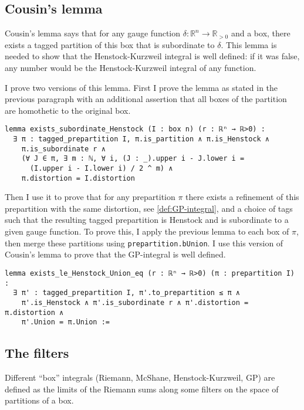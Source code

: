 \documentclass[a4paper,UKenglish,cleveref, autoref, thm-restate]{lipics-v2021}
\newcommand{\bbR}{\mathbb{R}}
\begin{document}
\subsection{Cousin's lemma}\label{sec:cousins-lemma}

Cousin's lemma says that for any gauge function
\(\delta\colon\bbR^{n}\to\bbR_{>0}\) and a box, there exists a tagged
partition of this box that is subordinate to \(\delta\). This lemma is
needed to show that the Henstock-Kurzweil integral is well defined: if
it was false, any number would be the Henstock-Kurzweil integral of
any function.

I prove two versions of this lemma. First I prove the lemma as stated
in the previous paragraph with an additional assertion that all boxes
of the partition are homothetic to the original box.

\begin{lstlisting}[caption={Cousin's lemma, version 1}]
lemma exists_subordinate_Henstock (I : box n) (r : ℝⁿ → ℝ>0) :
  ∃ π : tagged_prepartition I, π.is_partition ∧ π.is_Henstock ∧
    π.is_subordinate r ∧
    (∀ J ∈ π, ∃ m : ℕ, ∀ i, (J : _).upper i - J.lower i =
      (I.upper i - I.lower i) / 2 ^ m) ∧
    π.distortion = I.distortion
\end{lstlisting}

Then I use it to prove that for any prepartition \(\pi\) there exists
a refinement of this prepartition with the same distortion, see
\autoref{def:GP-integral}, and a choice of tags such that the
resulting tagged prepartition is Henstock and is subordinate to a
given gauge function. To prove this, I apply the previous lemma to
each box of \(\pi\), then merge these partitions using
\lstinline=prepartition.bUnion=. I use this version of Cousin's lemma
to prove that the GP-integral is well defined.

\begin{lstlisting}[caption={Cousin's lemma, version 2}]
lemma exists_le_Henstock_Union_eq (r : ℝⁿ → ℝ>0) (π : prepartition I) :
  ∃ π' : tagged_prepartition I, π'.to_prepartition ≤ π ∧
    π'.is_Henstock ∧ π'.is_subordinate r ∧ π'.distortion = π.distortion ∧
    π'.Union = π.Union :=
\end{lstlisting}

\subsection{The filters}\label{sec:filters}

Different “box” integrals (Riemann, McShane, Henstock-Kurzweil, GP)
are defined as the limits of the Riemann sums along some filters on
the space of partitions of a box.
\end{document}
